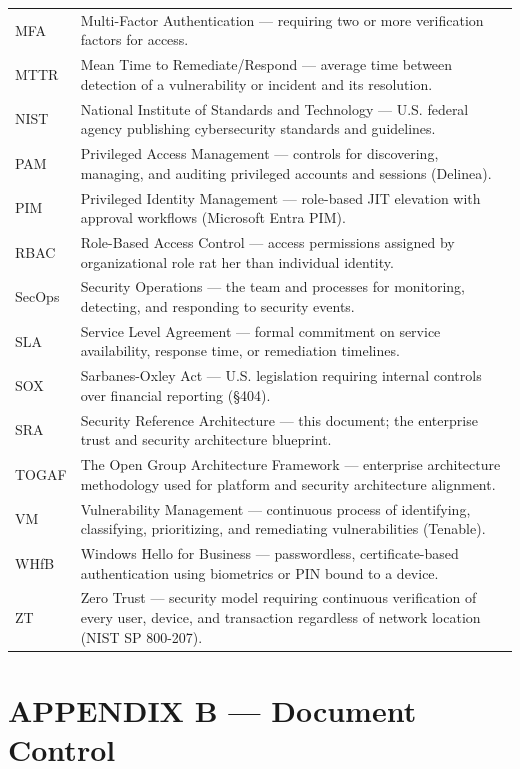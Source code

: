\documentclass[11pt,landscape]{article}
\begin{document}
\begin{longtable}{lp{7in}}
MFA & Multi-Factor Authentication --- requiring two or more verification factors for access. \\
MTTR & Mean Time to Remediate/Respond --- average time between detection of a vulnerability or incident and its resolution. \\
NIST & National Institute of Standards and Technology --- U.S. federal agency publishing cybersecurity standards and guidelines. \\
PAM & Privileged Access Management --- controls for discovering, managing, and auditing privileged accounts and sessions (Delinea). \\
PIM & Privileged Identity Management --- role-based JIT elevation with approval workflows (Microsoft Entra PIM). \\
RBAC & Role-Based Access Control --- access permissions assigned by organizational role rat her than individual identity. \\
SecOps & Security Operations --- the team and processes for monitoring, detecting, and responding to security events. \\
SLA & Service Level Agreement --- formal commitment on service availability, response time, or remediation timelines. \\
SOX & Sarbanes-Oxley Act --- U.S. legislation requiring internal controls over financial reporting (\S 404). \\
SRA & Security Reference Architecture --- this document; the enterprise trust and security architecture blueprint. \\
TOGAF & The Open Group Architecture Framework --- enterprise architecture methodology used for platform and security architecture alignment. \\
VM & Vulnerability Management --- continuous process of identifying, classifying, prioritizing, and remediating vulnerabilities (Tenable). \\
WHfB & Windows Hello for Business --- passwordless, certificate-based authentication using biometrics or PIN bound to a device. \\
ZT & Zero Trust --- security model requiring continuous verification of every user, device, and transaction regardless of network location (NIST SP 800-207). \\
\bottomrule
\end{longtable}

\newpage

\section{APPENDIX B --- Document Control}
\label{app:doccontrol}
\end{document}
